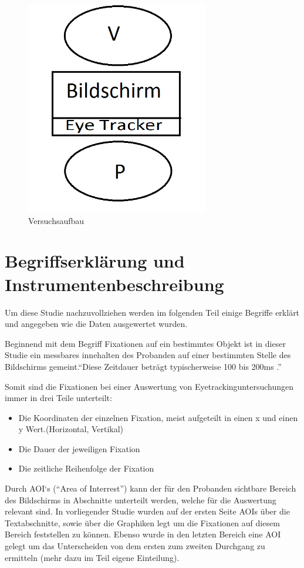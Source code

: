 \begin{figure}[!ht]
\noindent\hspace{0.5mm}\includegraphics[width=8cm]{./Ressourcen/Versuchsaufbau.png}
\caption{Versuchsaufbau}
\end{figure}

\section{Begriffserklärung und Instrumentenbeschreibung}
Um diese Studie nachzuvollziehen werden im folgenden Teil einige Begriffe erklärt und angegeben wie die Daten ausgewertet wurden. 

Beginnend mit dem Begriff Fixationen auf ein bestimmtes Objekt ist in dieser Studie ein messbares innehalten des Probanden auf einer bestimmten Stelle des Bildschirms gemeint.``Diese Zeitdauer beträgt typischerweise 100 bis 200ms\cite{EyetrackingFixation} .''

Somit sind die Fixationen bei einer Auswertung von Eyetrackinguntersuchungen immer in drei Teile unterteilt:
    \begin{itemize}
        \item Die Koordinaten der einzelnen Fixation, meist aufgeteilt in einen x und einen y Wert.(Horizontal, Vertikal)
        \item Die Dauer der jeweiligen Fixation
        \item Die zeitliche Reihenfolge der Fixation
    \end{itemize}


Durch AOI`s (``Area of Interrest'') kann der für den Probanden sichtbare Bereich des Bildschirms in Abschnitte unterteilt werden, welche für die Auswertung relevant sind. In vorliegender Studie wurden auf der ersten Seite AOIs über die Textabschnitte, sowie über die Graphiken legt um die Fixationen auf diesem Bereich feststellen zu können. Ebenso wurde in den letzten Bereich eine AOI gelegt um das Unterscheiden von dem ersten zum zweiten Durchgang zu ermitteln (mehr dazu im Teil eigene Einteilung).

